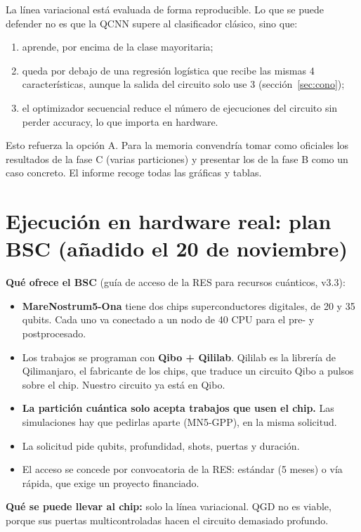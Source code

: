 \documentclass[11pt,a4paper]{article}
\begin{document}
\begin{keybox}
La línea variacional está evaluada de forma reproducible. Lo que se puede defender no es que la QCNN supere al
clasificador clásico, sino que:
\begin{enumerate}[leftmargin=*]
  \item aprende, por encima de la clase mayoritaria;
  \item queda por debajo de una regresión logística que recibe las mismas 4 características, aunque la salida del
        circuito solo use 3 (sección~\ref{sec:cono});
  \item el optimizador secuencial reduce el número de ejecuciones del circuito sin perder accuracy, lo que importa en hardware.
\end{enumerate}
Esto refuerza la opción A. Para la memoria convendría tomar como oficiales los resultados de la fase C (varias
particiones) y presentar los de la fase B como un caso concreto. El informe
 recoge todas las gráficas y tablas.
\end{keybox}

\section{Ejecución en hardware real: plan BSC (añadido el 20 de noviembre)}\label{sec:bsc}

\textbf{Qué ofrece el BSC} (guía de acceso de la RES para recursos cuánticos, v3.3):
\begin{itemize}
  \item \textbf{MareNostrum5-Ona} tiene dos chips superconductores digitales, de 20 y 35 qubits. Cada uno va conectado
        a un nodo de 40 CPU para el pre- y postprocesado.
  \item Los trabajos se programan con \textbf{Qibo + Qililab}. Qililab es la librería de Qilimanjaro, el fabricante de
        los chips, que traduce un circuito Qibo a pulsos sobre el chip. Nuestro circuito ya está en Qibo.
  \item \textbf{La partición cuántica solo acepta trabajos que usen el chip.} Las simulaciones hay que pedirlas aparte
        (MN5-GPP), en la misma solicitud.
  \item La solicitud pide qubits, profundidad, shots, puertas y duración.
  \item El acceso se concede por convocatoria de la RES: estándar (5 meses) o vía rápida, que exige un proyecto financiado.
\end{itemize}
\textbf{Qué se puede llevar al chip:} solo la línea variacional. QGD no es viable, porque sus puertas
multicontroladas hacen el circuito demasiado profundo.
\end{document}
